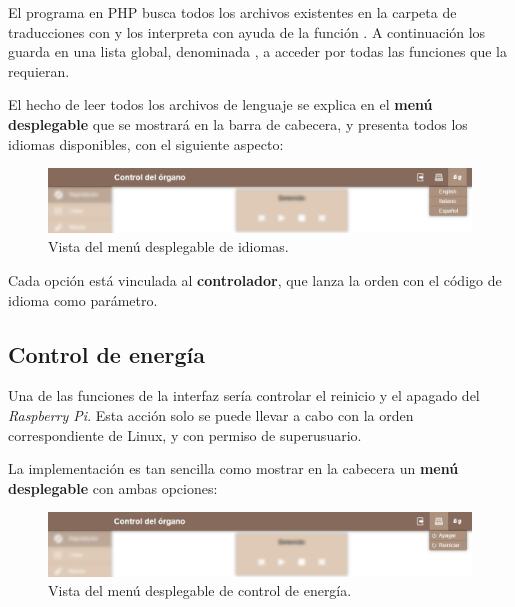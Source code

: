 El programa en PHP busca todos los archivos existentes en la carpeta de traducciones con  y los interpreta con ayuda de la función . A continuación los guarda en una lista global, denominada , a acceder por todas las funciones que la requieran.

El hecho de leer todos los archivos de lenguaje se explica en el \textbf{menú desplegable} que se mostrará en la barra de cabecera, y presenta todos los idiomas disponibles, con el siguiente aspecto:

\smallskip

\begin{figure}[H]
	\noindent \begin{centering}
		\includegraphics[width=\linewidth*3/4]{capitulo5/cap_repr_idiomas}
		\par\end{centering}
	\smallskip
	\caption{\label{fig:cap_repr_idiomas} Vista del menú desplegable de idiomas.}
\end{figure} 

\smallskip

Cada opción está vinculada al \textbf{controlador}, que lanza la orden  con el código de idioma como parámetro.

\subsection{Control de energía}

Una de las funciones de la interfaz sería controlar el reinicio y el apagado del \textit{Raspberry Pi}. Esta acción solo se puede llevar a cabo con la orden correspondiente de Linux, y con permiso de superusuario.

La implementación es tan sencilla como mostrar en la cabecera un \textbf{menú desplegable} con ambas opciones:

\smallskip

\begin{figure}[H]
	\noindent \begin{centering}
		\includegraphics[width=\linewidth*3/4]{capitulo5/cap_repr_apagar}
		\par\end{centering}
	\smallskip
	\caption{\label{fig:cap_repr_apagar} Vista del menú desplegable de control de energía.}
\end{figure} 

